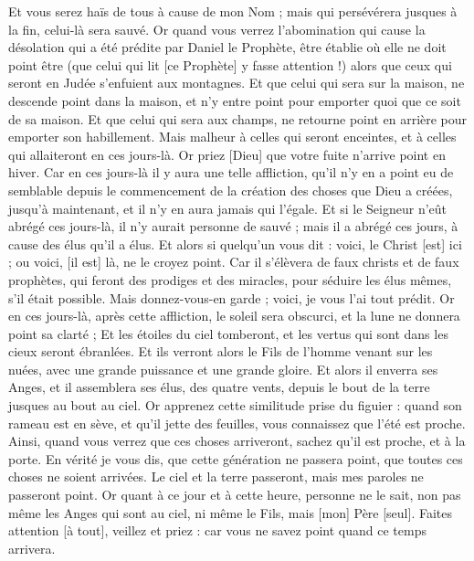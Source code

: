 \begin{multicols}{2}
Et vous serez haïs de tous à cause de mon Nom ; mais qui persévérera jusques à la fin, celui-là sera sauvé.
Or quand vous verrez l'abomination qui cause la désolation qui a été prédite par Daniel le Prophète, être établie où elle ne doit point être (que celui qui lit [ce Prophète] y fasse attention !) alors que ceux qui seront en Judée s'enfuient aux montagnes.
Et que celui qui sera sur la maison, ne descende point dans la maison, et n'y entre point pour emporter quoi que ce soit de sa maison.
Et que celui qui sera aux champs, ne retourne point en arrière pour emporter son habillement.
Mais malheur à celles qui seront enceintes, et à celles qui allaiteront en ces jours-là.
Or priez [Dieu] que votre fuite n'arrive point en hiver.
Car en ces jours-là il y aura une telle affliction, qu'il n'y en a point eu de semblable depuis le commencement de la création des choses que Dieu a créées, jusqu'à maintenant, et il n'y en aura jamais qui l'égale.
Et si le Seigneur n'eût abrégé ces jours-là, il n'y aurait personne de sauvé ; mais il a abrégé ces jours, à cause des élus qu'il a élus.
Et alors si quelqu'un vous dit : voici, le Christ [est] ici ; ou voici, [il est] là, ne le croyez point.
Car il s'élèvera de faux christs et de faux prophètes, qui feront des prodiges et des miracles, pour séduire les élus mêmes, s'il était possible.
Mais donnez-vous-en garde ; voici, je vous l'ai tout prédit.
Or en ces jours-là, après cette affliction, le soleil sera obscurci, et la lune ne donnera point sa clarté ;
Et les étoiles du ciel tomberont, et les vertus qui sont dans les cieux seront ébranlées.
Et ils verront alors le Fils de l'homme venant sur les nuées, avec une grande puissance et une grande gloire.
Et alors il enverra ses Anges, et il assemblera ses élus, des quatre vents, depuis le bout de la terre jusques au bout au ciel.
Or apprenez cette similitude prise du figuier : quand son rameau est en sève, et qu'il jette des feuilles, vous connaissez que l'été est proche.
Ainsi, quand vous verrez que ces choses arriveront, sachez qu'il est proche, et à la porte.
En vérité je vous dis, que cette génération ne passera point, que toutes ces choses ne soient arrivées.
Le ciel et la terre passeront, mais mes paroles ne passeront point.
Or quant à ce jour et à cette heure, personne ne le sait, non pas même les Anges qui sont au ciel, ni même le Fils, mais [mon] Père [seul].
Faites attention [à tout], veillez et priez : car vous ne savez point quand ce temps arrivera.

\end{multicols}
